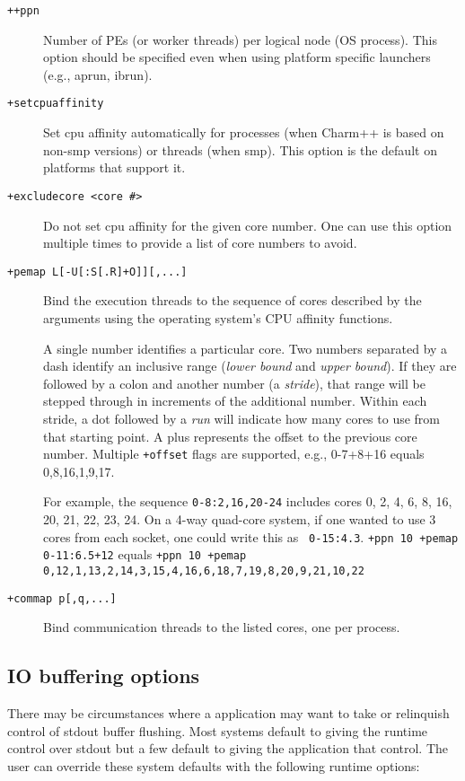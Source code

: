 \begin{description}

\item[{\tt ++ppn}]                       Number of PEs (or worker threads) per logical node (OS process). This option should be specified even when using platform specific launchers (e.g., aprun, ibrun).

\item[{\tt +setcpuaffinity}]             Set cpu affinity automatically for processes (when Charm++ is based on non-smp versions) or threads (when smp). This option is the default on platforms that support it.

\item[{\tt +excludecore <core \#>}]       Do not set cpu affinity for the given core number. One can use this option multiple times to provide a list of core numbers to avoid.

\item[{\tt +pemap L[-U[:S[.R]+O]][,...]}] Bind the execution threads to
  the sequence of cores described by the arguments using the operating
  system's CPU affinity functions.

A single number identifies a particular core. Two numbers separated by
a dash identify an inclusive range (\emph{lower bound} and \emph{upper
  bound}). If they are followed by a colon and another number (a
\emph{stride}), that range will be stepped through in increments of
the additional number. Within each stride, a dot followed by a
\emph{run} will indicate how many cores to use from that starting
point. A plus represents the offset to the previous core number. 
Multiple {\tt +offset} flags are supported, e.g., 0-7+8+16 equals 0,8,16,1,9,17.

For example, the sequence {\tt 0-8:2,16,20-24} includes cores 0, 2, 4,
6, 8, 16, 20, 21, 22, 23, 24. On a 4-way quad-core system, if one
wanted to use 3 cores from each socket, one could write this as {\tt
0-15:4.3}. {\tt +ppn 10 +pemap 0-11:6.5+12} equals {\tt +ppn 10 +pemap 
0,12,1,13,2,14,3,15,4,16,6,18,7,19,8,20,9,21,10,22}

\item[{\tt +commap p[,q,...]}] Bind communication threads to the
  listed cores, one per process.

\end{description}

\subsection{IO buffering options}
\label{io buffer options}
There may be circumstances where a \charmpp{} application may want to take
or relinquish control of stdout buffer flushing. Most systems default to
giving the \charmpp{} runtime control over stdout but a few default to
giving the application that control. The user can override these system
defaults with the following runtime options:

